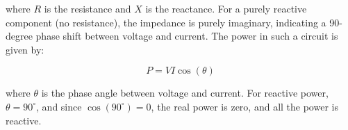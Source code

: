 where \( R \) is the resistance and \( X \) is the reactance. For a purely reactive component (no resistance), the impedance is purely imaginary, indicating a 90-degree phase shift between voltage and current. The power in such a circuit is given by:

\[
P = VI \cos(\theta)
\]

where \( \theta \) is the phase angle between voltage and current. For reactive power, \( \theta = 90^\circ \), and since \( \cos(90^\circ) = 0 \), the real power is zero, and all the power is reactive.

